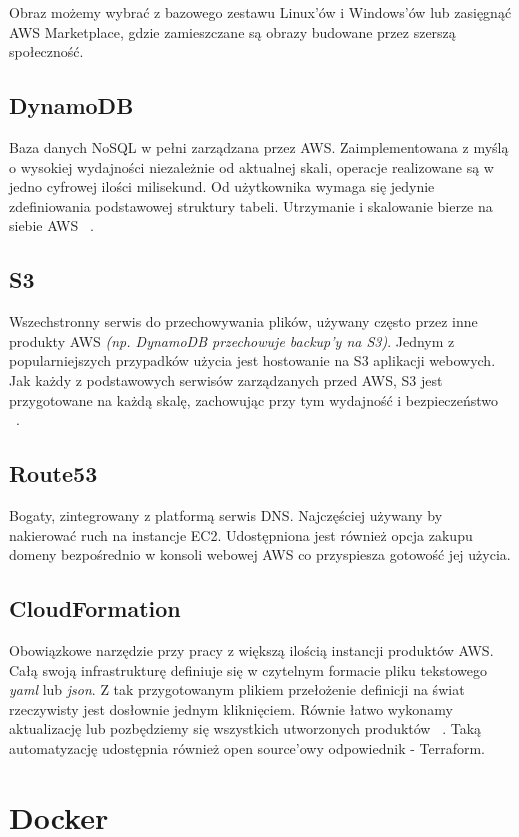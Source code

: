 Obraz możemy wybrać z bazowego zestawu Linux'ów i Windows'ów lub zasięgnąć AWS Marketplace, gdzie zamieszczane są obrazy budowane przez szerszą społeczność.

\subsection{DynamoDB}
Baza danych NoSQL w pełni zarządzana przez AWS. 
Zaimplementowana z myślą o wysokiej wydajności niezależnie od aktualnej skali, operacje realizowane są w jedno cyfrowej ilości milisekund.
Od użytkownika wymaga się jedynie zdefiniowania podstawowej struktury tabeli. Utrzymanie i skalowanie bierze na siebie AWS ~\cite{AWS-O}.

\subsection{S3}
Wszechstronny serwis do przechowywania plików, używany często przez inne produkty AWS {\em (np. DynamoDB przechowuje backup'y na S3)}. 
Jednym z popularniejszych przypadków użycia jest hostowanie na S3 aplikacji webowych. 
Jak każdy z podstawowych serwisów zarządzanych przed AWS, S3 jest przygotowane na każdą skalę, zachowując przy tym wydajność i bezpieczeństwo ~\cite{AWS-O}.

\subsection{Route53}
Bogaty, zintegrowany z platformą serwis DNS. Najczęściej używany by nakierować ruch na instancje EC2. 
Udostępniona jest również opcja zakupu domeny bezpośrednio w konsoli webowej AWS co przyspiesza gotowość jej użycia.

\subsection{CloudFormation} \label{cloudFormation}
Obowiązkowe narzędzie przy pracy z większą ilością instancji produktów AWS. 
Całą swoją infrastrukturę definiuje się w czytelnym formacie pliku tekstowego {\em yaml} lub {\em json}.
Z tak przygotowanym plikiem przełożenie definicji na świat rzeczywisty jest dosłownie jednym kliknięciem. 
Równie łatwo wykonamy aktualizację lub pozbędziemy się wszystkich utworzonych produktów ~\cite{AWS-O}.
Taką automatyzację udostępnia również open source'owy odpowiednik - Terraform.


\section{Docker}

